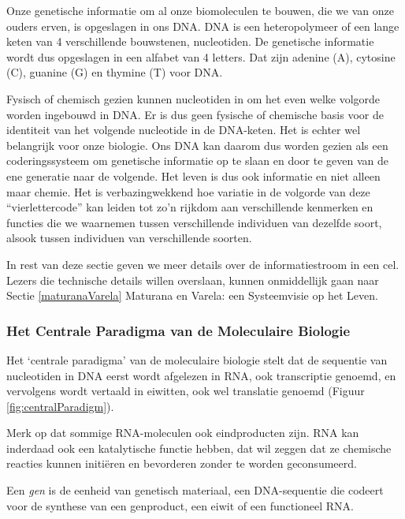 \documentclass[
  11pt,
]{book}
\begin{document}
Onze genetische informatie om al onze biomoleculen te bouwen, die we van onze ouders erven, is opgeslagen in ons DNA. DNA is een heteropolymeer of een lange keten van 4 verschillende bouwstenen, nucleotiden. De genetische informatie wordt dus opgeslagen in een alfabet van 4 letters. Dat zijn adenine (A), cytosine (C), guanine (G) en thymine (T) voor DNA.

Fysisch of chemisch gezien kunnen nucleotiden in om het even welke volgorde worden ingebouwd in DNA. Er is dus geen fysische of chemische basis voor de identiteit van het volgende nucleotide in de DNA-keten. Het is echter wel belangrijk voor onze biologie. Ons DNA kan daarom dus worden gezien als een coderingssysteem om genetische informatie op te slaan en door te geven van de ene generatie naar de volgende. Het leven is dus ook informatie en niet alleen maar chemie. Het is verbazingwekkend hoe variatie in de volgorde van deze ``vierlettercode'' kan leiden tot zo'n rijkdom aan verschillende kenmerken en functies die we waarnemen tussen verschillende individuen van dezelfde soort, alsook tussen individuen van verschillende soorten.

In rest van deze sectie geven we meer details over de informatiestroom in een cel. Lezers die technische details willen overslaan, kunnen onmiddellijk gaan naar Sectie \ref{maturanaVarela} Maturana en Varela: een Systeemvisie op het Leven.

\hypertarget{het-centrale-paradigma-van-de-moleculaire-biologie}{%
\subsubsection{Het Centrale Paradigma van de Moleculaire Biologie}\label{het-centrale-paradigma-van-de-moleculaire-biologie}}

Het `centrale paradigma' van de moleculaire biologie stelt dat de sequentie van nucleotiden in DNA eerst wordt afgelezen in RNA, ook transcriptie genoemd, en vervolgens wordt vertaald in eiwitten, ook wel translatie genoemd (Figuur \ref{fig:centralParadigm}).

Merk op dat sommige RNA-moleculen ook eindproducten zijn. RNA kan inderdaad ook een katalytische functie hebben, dat wil zeggen dat ze chemische reacties kunnen initiëren en bevorderen zonder te worden geconsumeerd.

Een \emph{gen} is de eenheid van genetisch materiaal, een DNA-sequentie die codeert voor de synthese van een genproduct, een eiwit of een functioneel RNA.
\end{document}
